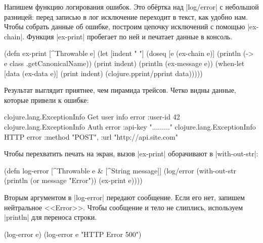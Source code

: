 Напишем функцию логирования ошибок. Это об\"{е}ртка над \spverb|log/error| с
небольшой разницей: перед записью в лог исключение переходит в текст, как удобно
нам. Чтобы собрать данные об ошибке, построим цепочку исключений с помощью
\spverb|ex-chain|. Функция \spverb|ex-print| пробегает по ней и печатает данные
в консоль.

\begin{english}
  \begin{clojure}
(defn ex-print
  [^Throwable e]
  (let [indent "  "]
    (doseq [e (ex-chain e)]
      (println (-> e class .getCanonicalName))
      (print indent)
      (println (ex-message e))
      (when-let [data (ex-data e)]
        (print indent)
        (clojure.pprint/pprint data)))))
  \end{clojure}
\end{english}

Результат выглядит приятнее, чем пирамида трейсов. Четко видны данные, которые
привели к ошибке:

\begin{english}
  \begin{clojure}
clojure.lang.ExceptionInfo
  Get user info error
  {:user-id 42}
clojure.lang.ExceptionInfo
  Auth error
  {:api-key "........."}
clojure.lang.ExceptionInfo
  HTTP error
  {:method "POST", :url "http://api.site.com"}
  \end{clojure}
\end{english}

Чтобы перехватить печать на экран, вызов \spverb|ex-print| оборачивают в
\spverb|with-out-str|:

\begin{english}
  \begin{clojure}
(defn log-error
  [^Throwable e & [^String message]]
  (log/error
   (with-out-str
     (println (or message "Error"))
     (ex-print e))))
  \end{clojure}
\end{english}

Вторым аргументом в \spverb|log-error| передают сообщение. Если его нет, запишем
нейтральное <<Error>>. Чтобы сообщение и тело не слиплись, используем
\spverb|println| для переноса строки.

\begin{english}
  \begin{clojure}
(log-error e)
(log-error e "HTTP Error 500")
  \end{clojure}
\end{english}

